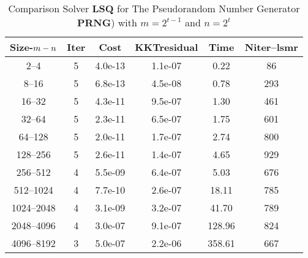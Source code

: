 \documentclass[letterpaper,12pt,oneside,final]{book}
\begin{document}
\begin{table}
\caption{Comparison Solver {\bf LSQ}  for  The Pseudorandom Number Generator {\bf PRNG}) with $m=2^{t-1}$ and $n=2^{t}$}  
\begin{center}
\begin{tabular}{|*{6}{c}|} \hline
Size-$m\--n$ & \multicolumn{1}{c}{Iter} & \multicolumn{1}{c}{Cost}& \multicolumn{1}{c}{KKTresidual} & \multicolumn{1}{c}{Time} & \multicolumn{1}{c|}{Niter--lsmr} \\ 
\hline
2--4           &5    &4.0e-13        &1.1e-07        &0.22           &86   \\ 
8--16          &5    &6.8e-13        &4.5e-08        &0.78           &293  \\ 
16--32         &5    &4.3e-11        &9.5e-07        &1.30           &461  \\ 
32--64         &5    &2.3e-11        &6.5e-07        &1.75           &601  \\ 
64--128        &5    &2.0e-11        &1.7e-07        &2.74           &800  \\ 
128--256       &5    &2.6e-11        &1.4e-07        &4.65           &929  \\ 
256--512       &4    &5.5e-09        &6.4e-07        &5.03           &676  \\ 
512--1024      &4    &7.7e-10        &2.6e-07        &18.11          &785  \\ 
1024--2048     &4    &3.1e-09        &3.2e-07        &41.70          &789  \\ 
2048--4096     &4    &3.0e-07        &9.1e-07        &128.96         &824  \\  
4096--8192     &3    &5.0e-07        &2.2e-06        &358.61         &667  \\ 
\hline
\end{tabular}
\end{center}
\end{table}
\end{document}
